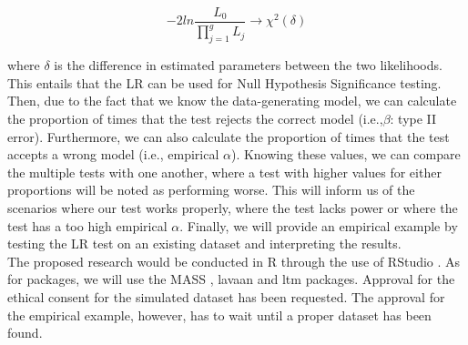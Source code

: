 \documentclass{article}
\begin{document}
\begin{equation}
- 2ln\frac{L_0}{\prod_{j = 1}^g L_j} \rightarrow \chi^{2}(\delta)
\end{equation}

where $\delta$ is the difference in estimated parameters between the two likelihoods. This entails that the LR can be used for Null Hypothesis Significance testing. Then, due to the fact that we know the data-generating model, we can calculate the proportion of times that the test rejects the correct model (i.e.,$\beta$: type II error). Furthermore, we can also calculate the proportion of times that the test accepts a wrong model (i.e., empirical $\alpha$). Knowing these values, we can compare the multiple tests with one another, where a test with higher values for either proportions will be noted as performing worse. This will inform us of the scenarios where our test works properly, where the test lacks power or where the test has a too high empirical $\alpha$. Finally, we will provide an empirical example by testing the LR test on an existing dataset and interpreting the results. \\
\indent The proposed research would be conducted in R \autocite{R} through the use of RStudio \autocite{Rstudio}. As for packages, we will use the MASS \autocite{mass}, lavaan \autocite{lavaan} and ltm \autocite{ltmpack} packages. Approval for the ethical consent for the simulated dataset has been requested. The approval for the empirical example, however, has to wait until a proper dataset has been found.


\nocite{*}

\newpage
\printbibliography
\end{document}
